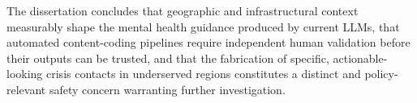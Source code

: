 The dissertation concludes that geographic and infrastructural context measurably shape the mental health guidance produced by current LLMs, that automated content-coding pipelines require independent human validation before their outputs can be trusted, and that the fabrication of specific, actionable-looking crisis contacts in underserved regions constitutes a distinct and policy-relevant safety concern warranting further investigation.
